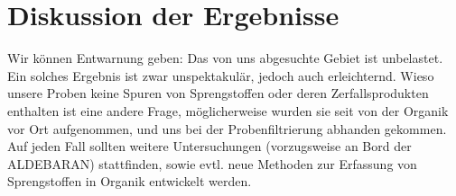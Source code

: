  
\chapter[Diskussion der Ergebnisse]{Diskussion der Ergebnisse}
Wir können Entwarnung geben: Das von uns abgesuchte Gebiet ist unbelastet. Ein
solches Ergebnis ist zwar unspektakulär, jedoch auch erleichternd. Wieso 
unsere Proben keine Spuren von Sprengstoffen oder deren Zerfallsprodukten 
enthalten ist eine andere Frage, möglicherweise wurden sie seit %
von der Organik vor Ort aufgenommen, und uns bei der Probenfiltrierung
abhanden gekommen. Auf jeden Fall sollten weitere Untersuchungen (vorzugsweise
an Bord der ALDEBARAN) stattfinden, sowie evtl. neue Methoden zur Erfassung
von Sprengstoffen in Organik entwickelt werden.
